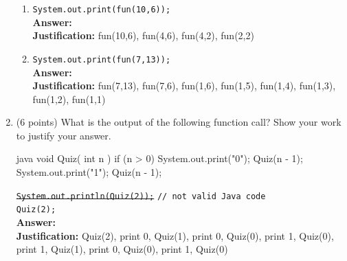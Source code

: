 \documentclass[12pt, a4paper]{article}
\begin{document}
\begin{enumerate}
    \begin{enumerate}
        
        \item \verb|System.out.print(fun(10,6));| \\
        \hspace*{\fill} \textbf{Answer:}  \\
        \textbf{Justification:} fun(10,6), fun(4,6), fun(4,2), fun(2,2)

        \item \verb|System.out.print(fun(7,13));| \\
        \hspace*{\fill} \textbf{Answer:}  \\
        \textbf{Justification:} fun(7,13), fun(7,6), fun(1,6), fun(1,5), fun(1,4), fun(1,3), fun(1,2), fun(1,1)

    \end{enumerate}



    \newpage



    \item (6 points) What is the output of the following function call?
        Show your work to justify your answer.
    \begin{MintedUnbreakableCodeBlock}{java}
        void Quiz( int n ) {
            if (n > 0) {
                System.out.print("0");
                Quiz(n - 1);
                System.out.print("1");
                Quiz(n - 1);
            }
        }\end{MintedUnbreakableCodeBlock}

    \sout{\texttt{System.out.println(Quiz(2));}} \verb|// not valid Java code| \\
    \verb|Quiz(2);| \\
    \hspace*{\fill} \textbf{Answer:}  \\
    \textbf{Justification:} Quiz(2),
        print 0,
        Quiz(1),
            print 0,
            Quiz(0),
            print 1,
            Quiz(0),
        print 1,
        Quiz(1),
            print 0,
            Quiz(0),
            print 1,
            Quiz(0)



    \newpage




\end{enumerate}
\end{document}
